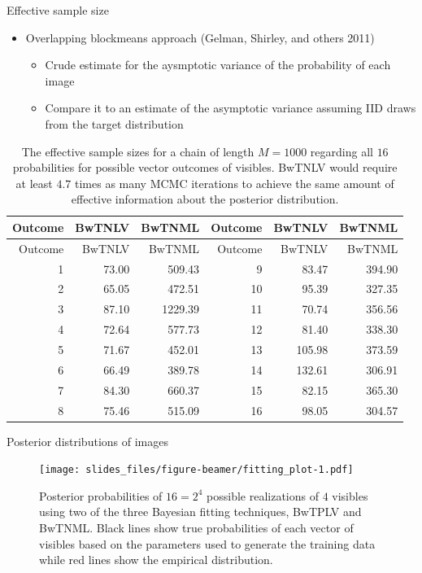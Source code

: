 \documentclass[ignorenonframetext,]{beamer}
\providecommand{\tightlist}{%
  \setlength{\itemsep}{0pt}\setlength{\parskip}{0pt}}
\theoremstyle{definition}
\begin{document}
\begin{frame}{Effective sample size}
\protect\hypertarget{effective-sample-size}{}

\begin{itemize}
\tightlist
\item
  Overlapping blockmeans approach (Gelman, Shirley, and others 2011)

  \begin{itemize}
  \tightlist
  \item
    Crude estimate for the aysmptotic variance of the probability of
    each image
  \item
    Compare it to an estimate of the asymptotic variance assuming IID
    draws from the target distribution
  \end{itemize}
\end{itemize}

\tiny

\begin{longtable}[]{@{}rrrrrr@{}}
\caption{\label{tab:m_eff}The effective sample sizes for a chain of
length \(M = 1000\) regarding all \(16\) probabilities for possible
vector outcomes of visibles. BwTNLV would require at least \(4.7\) times
as many MCMC iterations to achieve the same amount of effective
information about the posterior distribution.}\tabularnewline
\toprule
Outcome & BwTNLV & BwTNML & Outcome & BwTNLV & BwTNML\tabularnewline
\midrule
\endfirsthead
\toprule
Outcome & BwTNLV & BwTNML & Outcome & BwTNLV & BwTNML\tabularnewline
\midrule
\endhead
1 & 73.00 & 509.43 & 9 & 83.47 & 394.90\tabularnewline
2 & 65.05 & 472.51 & 10 & 95.39 & 327.35\tabularnewline
3 & 87.10 & 1229.39 & 11 & 70.74 & 356.56\tabularnewline
4 & 72.64 & 577.73 & 12 & 81.40 & 338.30\tabularnewline
5 & 71.67 & 452.01 & 13 & 105.98 & 373.59\tabularnewline
6 & 66.49 & 389.78 & 14 & 132.61 & 306.91\tabularnewline
7 & 84.30 & 660.37 & 15 & 82.15 & 365.30\tabularnewline
8 & 75.46 & 515.09 & 16 & 98.05 & 304.57\tabularnewline
\bottomrule
\end{longtable}

\end{frame}

\begin{frame}{Posterior distributions of images}
\protect\hypertarget{posterior-distributions-of-images}{}

\begin{figure}
\centering
\texttt{[image: slides\_files/figure-beamer/fitting\_plot-1.pdf]}
\caption{\label{fig:fitting_plot}Posterior probabilities of \(16 = 2^4\)
possible realizations of \(4\) visibles using two of the three Bayesian
fitting techniques, BwTPLV and BwTNML. Black lines show true
probabilities of each vector of visibles based on the parameters used to
generate the training data while red lines show the empirical
distribution.}
\end{figure}

\end{frame}
\end{document}
